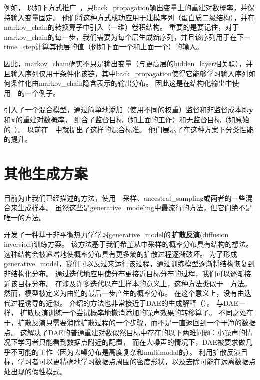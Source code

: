 例如， \citet{Zhou+Troyanskaya-ICML2014} 以如下方式推广~，只\gls{back_propagation}输出变量上的重建对数概率，并保持输入变量固定。
他们将这种方式成功应用于建模序列（蛋白质二级结构），并在\gls{markov_chain}的转换算子中引入（一维）卷积结构。
重要的是要记住，对于\gls{markov_chain}的每一步，我们需要为每个层生成新序列，并且该序列用于在下一\gls{time_step}计算其他层的值（例如下面一个和上面一个）的输入。

因此，\gls{markov_chain}确实不只是输出变量（与更高层的\gls{hidden_layer}相关联），并且输入序列仅用于条件化该链，其中\gls{back_propagation}使得它能够学习输入序列如何条件化由\gls{markov_chain}隐含表示的输出分布。
因此这是在结构化输出中使用~~的一个例子。

\citet{Zohrer+Pernkopf-NIPS2014-small} 引入了一个混合模型，通过简单地添加（使用不同的权重）监督和非监督成本即$\mathbf{y}$和$\mathbf{x}$的重建对数概率， 组合了监督目标（如上面的工作）和无监督目标（如原始的~）。
\citet{Larochelle+Bengio-2008-small}以前在~~中就提出了这样的混合标准。
他们展示了在这种方案下分类性能的提升。


\section{其他生成方案}
\label{sec:other_generation_schemes}
目前为止我们已经描述的方法，使用~~采样、\gls{ancestral_sampling}或两者的一些混合来生成样本。
虽然这些是\gls{generative_modeling}中最流行的方法，但它们绝不是唯一的方法。


\citet{Sohl-Dickstein-et-al-ICML2015} 开发了一种基于非平衡热力学学习\gls{generative_model}的\,\textbf{扩散反演}(diffusion inversion)训练方案。
该方法基于我们希望从中采样的概率分布具有结构的想法。
这种结构会被递增地使概率分布具有更多熵的扩散过程逐渐破坏。
为了形成\gls{generative_model}，我们可以反过来运行该过程，通过训练模型逐渐将结构恢复到非结构化分布。
通过迭代地应用使分布更接近目标分布的过程，我们可以逐渐接近该目标分布。
在涉及许多迭代以产生样本的意义上，这种方法类似于~~方法。
然而，模型被定义为由链的最后一步产生的概率分布。
在这个意义上，没有由迭代过程诱导的近似。
\citet{Sohl-Dickstein-et-al-ICML2015} 介绍的方法也非常接近于\gls{DAE}的生成解释（）。
与\gls{DAE}一样， 扩散反演训练一个尝试概率地撤消添加的噪声效果的转移算子。
不同之处在于，扩散反演只需要消除扩散过程的一个步骤，而不是一直返回到一个干净的数据点。
这解决了\gls{DAE}的普通重建对数似然目标中存在的以下两难问题：小噪声的情况下学习者只能看到数据点附近的配置， 而在大噪声的情况下，\gls{DAE}被要求做几乎不可能的工作（因为去噪分布是高度复杂和\gls{multimodal}的）。
利用扩散反演目标，学习者可以更精确地学习数据点周围的密度形状，以及去除可能在远离数据点处出现的假性模式。

